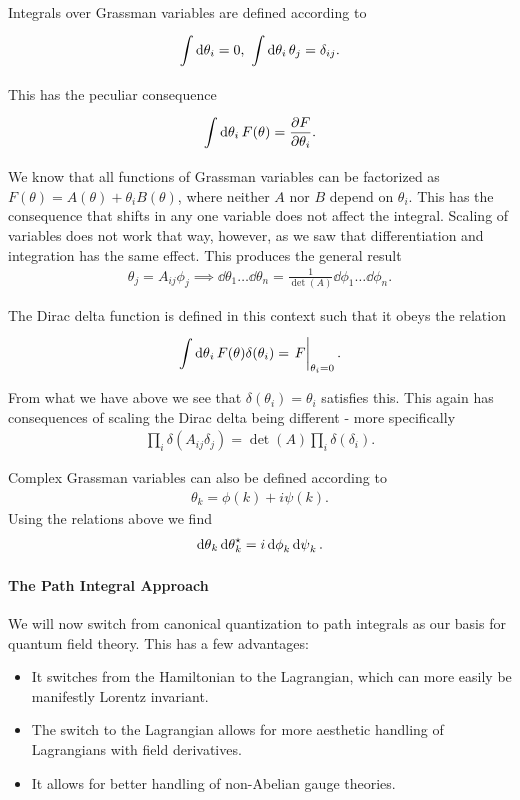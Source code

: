 Integrals over Grassman variables are defined according to
\begin{align*}
	\int\limits_{}^{}\dd{\theta_{i}} = 0,\ \int\limits_{}^{}\dd{\theta_{i}}\theta_{j} = \delta_{ij}.
\end{align*}
This has the peculiar consequence
\begin{align*}
	\int\limits_{}^{}\dd{\theta_{i}}F(\theta) = \pdv{F}{\theta_{i}}.
\end{align*}
We know that all functions of Grassman variables can be factorized as $F(\theta) = A(\theta) + \theta_{i}B(\theta)$, where neither $A$ nor $B$ depend on $\theta_{i}$. This has the consequence that shifts in any one variable does not affect the integral. Scaling of variables does not work that way, however, as we saw that differentiation and integration has the same effect. This produces the general result
\begin{align*}
	\theta_{j} = A_{ij}\phi_{j}\implies \dd{\theta}_{1}\dots\dd{\theta}_{n} = \frac{1}{\det(A)}\dd{\phi}_{1}\dots\dd{\phi}_{n}.
\end{align*}

The Dirac delta function is defined in this context such that it obeys the relation
\begin{align*}
	\inte{}{}\dd{\theta}_{i}F(\theta)\delta(\theta_{i}) = \eval{F}_{\theta_{i} = 0}.
\end{align*}
From what we have above we see that $\delta(\theta_{i}) = \theta_{i}$ satisfies this. This again has consequences of scaling the Dirac delta being different - more specifically
\begin{align*}
	\prod\limits_{i}\delta(A_{ij}\delta_{j}) = \det(A)\prod\limits_{i}\delta(\delta_{i}).
\end{align*}

Complex Grassman variables can also be defined according to
\begin{align*}
	\theta_{k} = \phi(k) + i\psi(k).
\end{align*}
Using the relations above we find
\begin{align*}
	\dd{\theta}_{k}\dd{\theta}_{k}^{\star} = i\dd{\phi}_{k}\dd{\psi}_{k}.
\end{align*}

\paragraph{The Path Integral Approach}
We will now switch from canonical quantization to path integrals as our basis for quantum field theory. This has a few advantages:
\begin{itemize}
	\item It switches from the Hamiltonian to the Lagrangian, which can more easily be manifestly Lorentz invariant.
	\item The switch to the Lagrangian allows for more aesthetic handling of Lagrangians with field derivatives.
	\item It allows for better handling of non-Abelian gauge theories.
\end{itemize}

